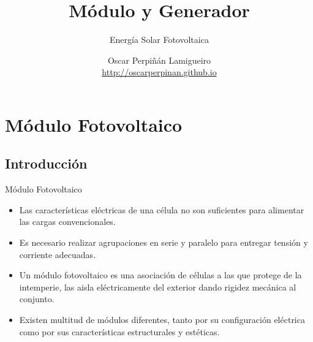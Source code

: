 \documentclass[xcolor={usenames,svgnames,dvipsnames}]{beamer}
\author{Oscar Perpiñán Lamigueiro \\ \url{http://oscarperpinan.github.io}}
\date{}
\title{Módulo y Generador}
\subtitle{Energía Solar Fotovoltaica}
\begin{document}
\maketitle

\section{Módulo Fotovoltaico}
\label{sec:org0c11886}

\subsection{Introducción}
\label{sec:org4f21ede}

\begin{frame}[label={sec:org94cc5fc}]{Módulo Fotovoltaico}
\begin{itemize}[<+->]
\item Las características eléctricas de una célula no son suficientes para alimentar las cargas convencionales.

\item Es necesario realizar \alert{agrupaciones en serie y paralelo para entregar tensión y corriente adecuadas}.

\item Un \alert{módulo fotovoltaico} es una \alert{asociación de células} a las que \alert{protege de la intemperie}, las \alert{aisla eléctricamente} del exterior dando \alert{rigidez mecánica} al conjunto.

\item Existen multitud de módulos diferentes, tanto por su configuración eléctrica como por sus características estructurales y estéticas.
\end{itemize}
\end{frame}
\end{document}

